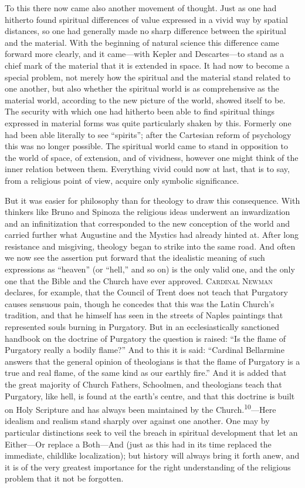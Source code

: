 \documentclass[12pt,a4paper]{book}
\newcommand{\opage}[1]{\marginnote{\footnotesize\textit{[#1]}}}
\begin{document}
To this there now came also another movement of thought. Just as one had
hitherto found spiritual differences of value expressed in a vivid way by
spatial distances, so one had generally made no sharp difference between the
spiritual and the material. With the beginning of natural science this
difference came forward more clearly, and it came---with Kepler and
Descartes---to stand as a chief mark of the material that it is extended in
space. It had now to become a special problem, not merely how the spiritual
and the material stand related to one another, but also whether the spiritual
world is as comprehensive as the material world, according to the new picture
of the world, showed itself to be. The security with which one had hitherto
been able to find spiritual things expressed in material forms was quite
particularly shaken by this. Formerly one had been able literally to see
``spirits''; after the Cartesian reform of psychology this was no longer
possible. The spiritual world came to stand in opposition to the world of
space, of extension, and of vividness, however one might think of the inner
relation between them. Everything vivid could now at last, that is to say,
from a religious point of view, acquire only symbolic significance.

But it was easier for philosophy than for theology to draw this consequence.
With thinkers like Bruno and Spinoza the religious ideas underwent an
inwardization and an infinitization that corresponded to the new conception
of the world and carried further what Augustine and the Mystics had already
hinted at. After long resistance and misgiving, theology began to strike into
the same road. And often we now see the assertion put forward that the
idealistic meaning of such expressions as ``heaven'' (or ``hell,'' and so on)
is the only valid one, and the only one that the Bible and the Church have
ever approved. \textsc{Cardinal Newman} declares, for example, that the
Council of Trent does not teach that Purgatory causes sensuous pain, though he
concedes that this was the Latin Church's tradition, and that he himself has
seen in the streets of Naples paintings that represented souls burning in
Purgatory. But in an ecclesiastically sanctioned handbook on the doctrine of
Purgatory the question is raised: ``Is the flame of Purgatory really a bodily
flame?'' And to this it is said: ``Cardinal Bellarmine answers that 
\opage{30}the general
opinion of theologians is that the flame of Purgatory is a true and real
flame, of the same kind as our earthly fire.'' And it is added that the great
majority of Church Fathers, Schoolmen, and theologians teach that Purgatory,
like hell, is found at the earth's centre, and that this doctrine is built on
Holy Scripture and has always been maintained by the
Church.\textsuperscript{10}---Here idealism and realism stand sharply over
against one another. One may by particular distinctions seek to veil the
breach in spiritual development that let an Either---Or replace a
Both---And (just as this had in its time replaced the immediate, childlike
localization); but history will always bring it forth anew, and it is of the
very greatest importance for the right understanding of the religious problem
that it not be forgotten.
\end{document}
